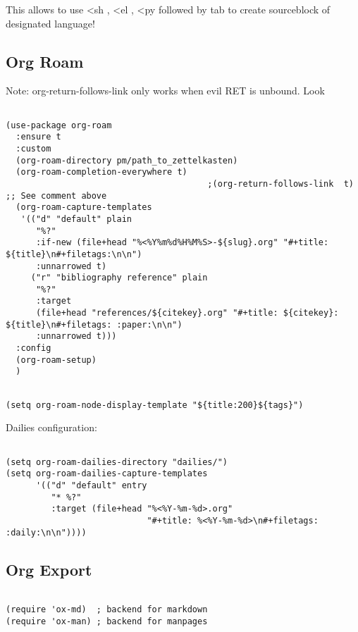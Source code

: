 \documentclass[11pt]{article}
\begin{document}
This allows to use <sh , <el , <py followed by tab to create sourceblock of designated language!

\subsection{Org Roam}
\label{sec:orgee00da8}

Note: org-return-follows-link only works when evil RET is unbound. Look \url{}

\begin{verbatim}

(use-package org-roam
  :ensure t
  :custom
  (org-roam-directory pm/path_to_zettelkasten)
  (org-roam-completion-everywhere t)
										;(org-return-follows-link  t)                          ;; See comment above
  (org-roam-capture-templates
   '(("d" "default" plain
	  "%?"
	  :if-new (file+head "%<%Y%m%d%H%M%S>-${slug}.org" "#+title: ${title}\n#+filetags:\n\n")
	  :unnarrowed t)
	 ("r" "bibliography reference" plain
	  "%?"
	  :target
	  (file+head "references/${citekey}.org" "#+title: ${citekey}: ${title}\n#+filetags: :paper:\n\n")
	  :unnarrowed t)))
  :config
  (org-roam-setup)
  )

\end{verbatim}

\begin{verbatim}

(setq org-roam-node-display-template "${title:200}${tags}")

\end{verbatim}

Dailies configuration:

\begin{verbatim}

(setq org-roam-dailies-directory "dailies/")
(setq org-roam-dailies-capture-templates
	  '(("d" "default" entry
		 "* %?"
		 :target (file+head "%<%Y-%m-%d>.org"
							"#+title: %<%Y-%m-%d>\n#+filetags: :daily:\n\n"))))

\end{verbatim}

\subsection{Org Export}
\label{sec:org74ef302}
\begin{verbatim}

(require 'ox-md)  ; backend for markdown
(require 'ox-man) ; backend for manpages

\end{verbatim}
\end{document}

